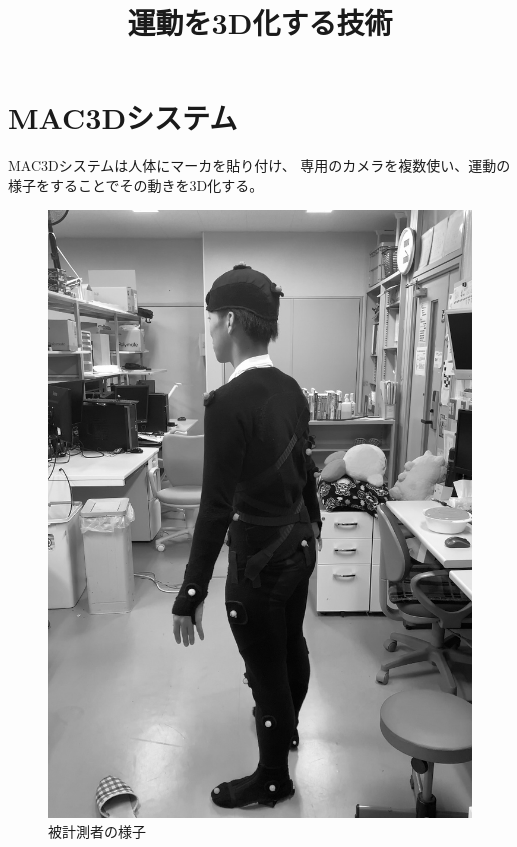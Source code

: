 \documentclass{jsarticle}
\title{運動を3D化する技術}
\date{}
\begin{document}
    \maketitle
    \section{MAC3Dシステム}
        MAC3Dシステムは人体にマーカを貼り付け、
        専用のカメラを複数使い、運動の様子をすることでその動きを3D化する。

        \begin{figure}[h]
            \begin{minipage}{0.5\hsize}
                \centering
                \includegraphics[width=0.9\hsize]{img/marker.jpg}
                \caption{被計測者の様子}
            \end{minipage}
            \begin{minipage}{0.5\hsize}
                \centering

\end{minipage}
\end{figure}
\end{document}
